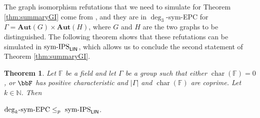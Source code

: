 \documentclass[10pt,a4paper]{article}
\newtheorem{theorem}{Theorem}
\newcommand{\Aut}{\mathbf{Aut}}
\newcommand{\EPC}{\mathrm{EPC}}
\newcommand{\N}{{\mathbb N}}
\newcommand{\Field}{\ensuremath{\mathbb{F}}}
\newcommand{\symIPSlin}{\text{ \upshape sym-IPS}_{\mathsf{LIN}}}
\DeclareMathOperator{\charact}{char}
\begin{document}
The graph isomorphism refutations that we need to simulate for Theorem \ref{thm:summaryGI} come from \cite[Theorem 1]{Pago}, and they are in $\deg_3$-sym-EPC for $\Gamma=\Aut(G) \times \Aut(H)$, where $G$ and $H$ are the two graphs to be distinguished.
The following theorem shows that these refutations can be simulated in$\symIPSlin$, which allows us to conclude the second statement of Theorem \ref{thm:summaryGI}. 
\begin{theorem} 
	\label{thm:symdegEPC<=symIPS}
	Let $\Field$ be a field and let $\Gamma$ be a group
	such that either $\charact(\Field) = 0$, or $\bbF$ has positive characteristic and $|\Gamma|$ and $\charact(\Field)$ are coprime. Let $k \in \N$. Then
	\begin{center}
		$\mathrm{deg}_k \text{-}\mathrm{sym}\text{-}\EPC  \leq_p  \symIPSlin$.
	\end{center}
\end{theorem}
\end{document}
